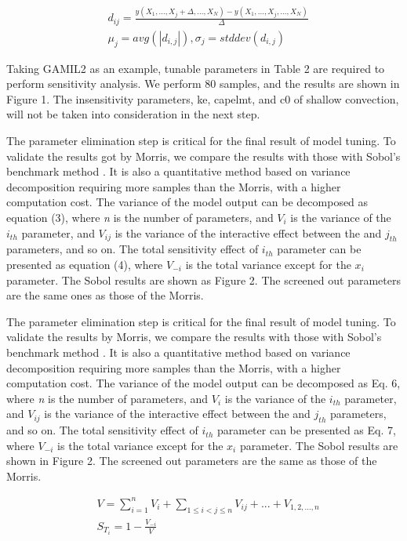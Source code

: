 \documentclass[gmd, manuscript]{copernicus}
\begin{document}
\begin{align}
& d_{ij} = \frac{y(X_1,...,X_j+\Delta,...,X_N)-y(X_1,...,X_j,...,X_N)}{\Delta} \\
& \mu_j = avg(|d_{i,j}|), \sigma_j = stddev(d_{i,j}) 
\end{align}

Taking GAMIL2 as an example, tunable parameters in Table 2 are required to perform sensitivity analysis. We perform 80 samples, and the results are shown in Figure 1. The insensitivity parameters, ke, capelmt, and c0 of shallow convection, will not be taken into consideration in the next step.


The parameter elimination step is critical for the final result of model tuning. To validate the results got by Morris, we compare the results with those with Sobol’s benchmark method \citep{sobol2001global}. It is also a quantitative method based on variance decomposition requiring more samples than the Morris, with a higher computation cost. The variance of the model output can be decomposed as equation (3), where \textit{n} is the number of parameters, and $V_i$ is the variance of the $i_{th}$ parameter, and $V_{ij}$ is the variance of the interactive effect between the  and $j_{th}$ parameters, and so on. The total sensitivity effect of $i_{th}$ parameter can be presented as equation (4), where $V_{-i}$ is the total variance except for the $x_i$ parameter. The Sobol results are shown as Figure 2.  The screened out parameters are the same ones as those of the Morris.

The parameter elimination step is critical for the final result of model tuning. To validate the results by Morris, we compare the results with those with Sobol’s benchmark method \citep{sobol2001global}. It is also a quantitative method based on variance decomposition requiring more samples than the Morris, with a higher computation cost. The variance of the model output can be decomposed as Eq. 6, where \textit{n} is the number of parameters, and $V_i$ is the variance of the $i_{th}$ parameter, and $V_{ij}$ is the variance of the interactive effect between the  and $j_{th}$ parameters, and so on. The total sensitivity effect of $i_{th}$ parameter can be presented as Eq. 7, where $V_{-i}$ is the total variance except for the $x_i$ parameter. The Sobol results are shown in Figure 2.  The screened out parameters are the same as those of the Morris.

\begin{align}
& V = \sum_{i=1}^n V_i + \sum_{1 \leq i < j \leq n} V_{ij} + ... + V_{1,2,...,n}  \\
& S_{T_i} = 1 - \frac{V_{-i}}{V} 
\end{align}
\end{document}
